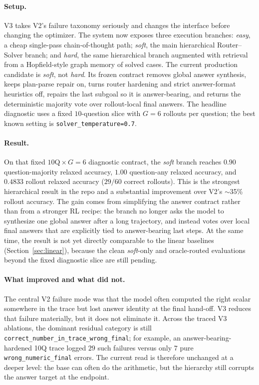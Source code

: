 \documentclass[11pt]{article}
\begin{document}
\paragraph{Setup.} V3 takes V2's failure taxonomy seriously and changes the interface before changing the optimizer. The system now exposes three execution branches: \emph{easy}, a cheap single-pass chain-of-thought path; \emph{soft}, the main hierarchical Router--Solver branch; and \emph{hard}, the same hierarchical branch augmented with retrieval from a Hopfield-style graph memory of solved cases. The current production candidate is \emph{soft}, not \emph{hard}. Its frozen contract removes global answer synthesis, keeps plan-parse repair on, turns router hardening and strict answer-format heuristics off, repairs the last subgoal so it is answer-bearing, and returns the deterministic majority vote over rollout-local final answers. The headline diagnostic uses a fixed $10$-question slice with $G{=}6$ rollouts per question; the best known setting is \texttt{solver\_temperature=0.7}.

\paragraph{Result.} On that fixed $10\mathrm{Q}\times G{=}6$ diagnostic contract, the \emph{soft} branch reaches $0.90$ question-majority relaxed accuracy, $1.00$ question-any relaxed accuracy, and $0.4833$ rollout relaxed accuracy ($29/60$ correct rollouts). This is the strongest hierarchical result in the repo and a substantial improvement over V2's $\sim$35\% rollout accuracy. The gain comes from simplifying the answer contract rather than from a stronger RL recipe: the branch no longer asks the model to synthesize one global answer after a long trajectory, and instead votes over local final answers that are explicitly tied to answer-bearing last steps. At the same time, the result is not yet directly comparable to the linear baselines (Section~\ref{sec:linear}), because the clean \emph{soft}-only and oracle-routed evaluations beyond the fixed diagnostic slice are still pending.

\paragraph{What improved and what did not.} The central V2 failure mode was that the model often computed the right scalar somewhere in the trace but lost answer identity at the final hand-off. V3 reduces that failure materially, but it does not eliminate it. Across the traced V3 ablations, the dominant residual category is still \texttt{correct\_number\_in\_trace\_wrong\_final}; for example, an answer-bearing-hardened 10Q trace logged $29$ such failures versus only $7$ pure \texttt{wrong\_numeric\_final} errors. The current read is therefore unchanged at a deeper level: the base can often do the arithmetic, but the hierarchy still corrupts the answer target at the endpoint.
\end{document}
